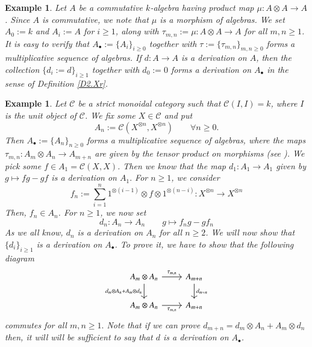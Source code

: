 \documentclass[10pt, colorlinks]{article}
\numberwithin{equation}{section} \DeclareMathSizes{2}{10}{12}{13}
\newtheorem{eg}[thm]{Example}
\begin{document}
\begin{eg}\label{eg1}
\emph{Let $A$ be a commutative $k$-algebra having   product map $\mu:A\otimes A\longrightarrow A$. Since $A$ is commutative, we note that $\mu$ is a morphism of algebras. We set $A_0:=k$ and $A_i:=A$ for $i\geq 1$, along with $\tau_{m,n}:=\mu:A\otimes A\longrightarrow A$ for all $m,n\geq 1$. It is easy to verify that $A_\bullet:=\{A_i\}_{i\geq 0}$ together with $\tau:=\{\tau_{m,n}\}_{m,n\geq 0}$ forms a multiplicative sequence of algebras. If $d: A\longrightarrow A$ is a derivation on $A$, then the collection 
    $\{d_i:=d\}_{i\geq1}$ together with $d_0:=0$ forms a derivation on ${A}_\bullet$ in the sense of Definition \ref{D2.Xr}.    }
\end{eg}
\begin{eg}
    \emph{Let $\mathscr{C}$ be a strict monoidal category such that $\mathscr C(I,I)=k$, where $I$ is the unit object of $\mathscr{C}$. We fix some  $X\in \mathscr C$ and put} $$A_n:=\mathscr C(X^{\otimes n},X^{\otimes n})\qquad\forall n\geq 0 .$$ 
    \emph{Then ${A}_\bullet:=\{A_n\}_{n\geq 0}$ forms a multiplicative sequence of algebras, where the maps $\tau_{m,n}:A_m\otimes A_n\longrightarrow A_{m+n}$ are given by the tensor product on morphisms  (see \cite[\S 2.1]{DAV}).
    We pick some $f\in A_1=\mathscr C(X,X)$. Then we know that the map $d_1:A_1\longrightarrow A_1$ given  by $g\mapsto fg-gf$ is a derivation on $A_1.$  For $n\geq 1$, we consider  $$f_n:=\sum_{i=1}^n1^{\otimes (i-1)}\otimes f\otimes 1^{\otimes (n-i)}:X^{\otimes n}\longrightarrow X^{\otimes n}$$
   Then, $f_n\in A_n$. For $n\geq 1$, we now set} \begin{equation}
        d_n:A_n\longrightarrow A_n\qquad g\mapsto f_ng-gf_n 
    \end{equation}
    \iffalse
    As we all know, $d_n$ is a derivation on $A_n$ for all $n\geq2$. We will now show that $\{d_i\}_{i\geq1}$ is a derivation on ${A}_\bullet$. To prove it, we have to show that the following diagram
    \begin{equation}
        \begin{tikzcd}\label{7}
A_m \otimes A_n
  \arrow[r, "\tau_{m,n}"]
  \arrow[d, "d_{m}\otimes A_n+A_m\otimes d_n"']
&
A_{m+n} 
  \arrow[d, "d_{m+n}"]
\\
A_m \otimes A_n
  \arrow[r, "\tau_{m,n}"']
&
A_{m+n}
\end{tikzcd}
    \end{equation}
    commutes for all $m,n\geq 1.$ Note that if we can prove $d_{m+n}=d_{m}\otimes A_n+A_m\otimes d_n$ then, it will will be sufficient to say that $d$ is a derivation on $A_\bullet$.

\end{eg}
\end{document}
